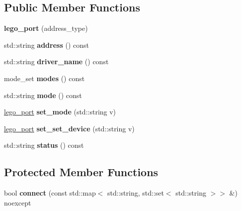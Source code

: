 \subsection*{Public Member Functions}
\begin{DoxyCompactItemize}
\item 
\mbox{\label{classev3dev_1_1lego__port_ab0986c607a2d5a35cd366c8fb549d309}} 
{\bfseries lego\+\_\+port} (address\+\_\+type)
\item 
\mbox{\label{classev3dev_1_1lego__port_ae8f22bd7ff0fb5f3aa0e9d19d18dc6cf}} 
std\+::string {\bfseries address} () const
\item 
\mbox{\label{classev3dev_1_1lego__port_ace6739572b4c8ad963ca1cd32bab73b6}} 
std\+::string {\bfseries driver\+\_\+name} () const
\item 
\mbox{\label{classev3dev_1_1lego__port_ad3f7f588357082295a8b9d3ec38d5e2a}} 
mode\+\_\+set {\bfseries modes} () const
\item 
\mbox{\label{classev3dev_1_1lego__port_a7e9a7a0e96b104227c318b3c3c4d966a}} 
std\+::string {\bfseries mode} () const
\item 
\mbox{\label{classev3dev_1_1lego__port_ae4b70133a77f2d66c4666f0731887a31}} 
\hyperlink{classev3dev_1_1lego__port}{lego\+\_\+port} {\bfseries set\+\_\+mode} (std\+::string v)
\item 
\mbox{\label{classev3dev_1_1lego__port_acb30f52baf36e941ef149968b854b92b}} 
\hyperlink{classev3dev_1_1lego__port}{lego\+\_\+port} {\bfseries set\+\_\+set\+\_\+device} (std\+::string v)
\item 
\mbox{\label{classev3dev_1_1lego__port_acd3b7e408d5d129774ac2543e71cfa62}} 
std\+::string {\bfseries status} () const
\end{DoxyCompactItemize}
\subsection*{Protected Member Functions}
\begin{DoxyCompactItemize}
\item 
\mbox{\label{classev3dev_1_1lego__port_aa52367dc0fbb80c2e596e61fdaae7e6e}} 
bool {\bfseries connect} (const std\+::map$<$ std\+::string, std\+::set$<$ std\+::string $>$$>$ \&) noexcept
\end{DoxyCompactItemize}
